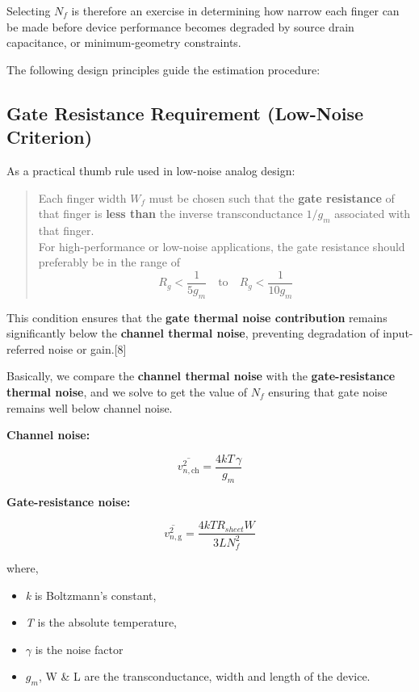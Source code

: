 \documentclass[
  11pt,
  a4paper,
  oneside]{scrbook}
\providecommand{\tightlist}{%
  \setlength{\itemsep}{0pt}\setlength{\parskip}{0pt}}
\begin{document}
Selecting \(N_f\) is therefore an exercise in determining how narrow
each finger can be made before device performance becomes degraded by
source drain capacitance, or minimum-geometry constraints.

The following design principles guide the estimation procedure:

\subsection{Gate Resistance Requirement (Low-Noise
Criterion)}\label{gate-resistance-requirement-low-noise-criterion}

As a practical thumb rule used in low-noise analog design:

\begin{quote}
Each finger width \(W_f\) must be chosen such that the \textbf{gate
resistance} of that finger is \textbf{less than} the inverse
transconductance \(1/g_m\) associated with that finger.\\
For high-performance or low-noise applications, the gate resistance
should preferably be in the range of\\
\[
R_g < \frac{1}{5 g_m} \quad \text{to} \quad R_g < \frac{1}{10 g_m}
\]
\end{quote}

This condition ensures that the \textbf{gate thermal noise contribution}
remains significantly below the \textbf{channel thermal noise},
preventing degradation of input-referred noise or gain.{[}8{]}

Basically, we compare the \textbf{channel thermal noise} with the
\textbf{gate-resistance thermal noise}, and we solve to get the value of
\(N_f\) ensuring that gate noise remains well below channel noise.

\textbf{Channel noise:}

\[
\overline{v_{n,\text{ch}}^2} = \frac{4 k T\, \gamma}{g_m}
\]

\textbf{Gate-resistance noise:}

\[
\overline{v_{n,\text{g}}^2} = \frac{4 k T R_{sheet} W}{3 L N_f^2} 
\]

where,

\begin{itemize}
\tightlist
\item
  \emph{k} is Boltzmann's constant,
\item
  \emph{T} is the absolute temperature,
\item
  \(\gamma\) is the noise factor
\item
  \(g_m\), W \& L are the transconductance, width and length of the
  device.
\end{itemize}
\end{document}
